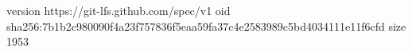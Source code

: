 version https://git-lfs.github.com/spec/v1
oid sha256:7b1b2c980090f4a23f757836f5eaa59fa37c4e2583989c5bd4034111e11f6cfd
size 1953
